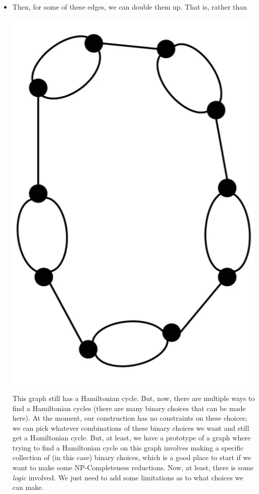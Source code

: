 \documentclass[letterpaper]{article}
\begin{document}
\begin{itemize}
    \item Then, for some of these edges, we can double them up. That is, rather than 
    \begin{center}
        \includegraphics[scale=0.35]{../assets/zoe_ham_2.png}
    \end{center}
    This graph still has a Hamiltonian cycle. But, now, there are multiple ways to find a Hamiltonian cycles (there are many binary choices that can be made here). At the moment, our construction has no constraints on these choices; we can pick whatever combinations of these binary choices we want and still get a Hamiltonian cycle. But, at least, we have a prototype of a graph where trying to find a Hamiltonian cycle on this graph involves making a specific collection of (in this case) binary choices, which is a good place to start if we want to make some NP-Completeness reductions. Now, at least, there is some \emph{logic} involved. We just need to add some limitations as to what choices we can make. 


\end{itemize}
\end{document}
